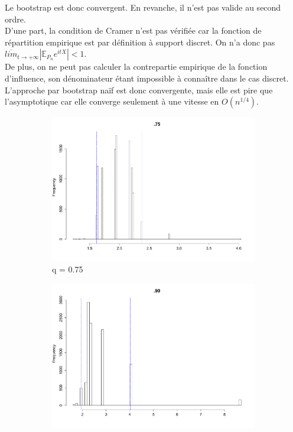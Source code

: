 \documentclass{article}
\renewcommand*{\(}{\left(}
\renewcommand*{\)}{\right)}
\begin{document}
Le bootstrap est donc convergent. En revanche, il n'est pas valide au second ordre. \\
D'une part, la condition de Cramer n'est pas vérifiée car la fonction de répartition empirique est par définition à support discret. On n'a donc pas $\overline{lim}_{t\rightarrow+\infty}|\mathbb{E}_{P_n}e^{itX}|<1$.\\
De plus, on ne peut pas calculer la contrepartie empirique de la fonction d'influence, son dénominateur étant impossible à connaître dans le cas discret.\\

L'approche par bootstrap naïf est donc convergente, mais elle est pire que l'asymptotique car elle converge seulement à une vitesse en $O(n^{1/4})$.

\begin{figure}[H]
    \centering
    \begin{subfigure}[b]{0.3\textwidth}
        \includegraphics[width = \linewidth]{img/BootstrapNaif-75-30.pdf}
        \caption{q = 0.75}
        \label{fig:naifB75}
    \end{subfigure}%
    \begin{subfigure}[b]{0.3\textwidth}
        \includegraphics[width = \linewidth]{img/BootstrapNaif-90-30.pdf}

\end{subfigure}
\end{figure}
\end{document}
